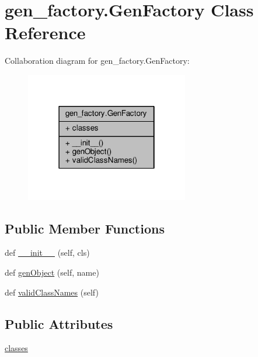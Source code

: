 \hypertarget{classgen__factory_1_1_gen_factory}{}\section{gen\+\_\+factory.\+Gen\+Factory Class Reference}
\label{classgen__factory_1_1_gen_factory}


Collaboration diagram for gen\+\_\+factory.\+Gen\+Factory\+:\nopagebreak
\begin{figure}[H]
\begin{center}
\leavevmode
\includegraphics[width=202pt]{classgen__factory_1_1_gen_factory__coll__graph}
\end{center}
\end{figure}
\subsection*{Public Member Functions}
\begin{DoxyCompactItemize}
\item 
def \hyperlink{classgen__factory_1_1_gen_factory_a519ddaf62a8d97e9ee0624e91ac39368}{\+\_\+\+\_\+init\+\_\+\+\_\+} (self, cls)
\item 
def \hyperlink{classgen__factory_1_1_gen_factory_aeb00856af2fa15d7973be43678779561}{gen\+Object} (self, name)
\item 
def \hyperlink{classgen__factory_1_1_gen_factory_aafa5db7ad22687c37e6b6a73da52fb2f}{valid\+Class\+Names} (self)
\end{DoxyCompactItemize}
\subsection*{Public Attributes}
\begin{DoxyCompactItemize}
\item 
\hyperlink{classgen__factory_1_1_gen_factory_a28f3142219cbe573169e5f90508908b3}{classes}
\end{DoxyCompactItemize}


